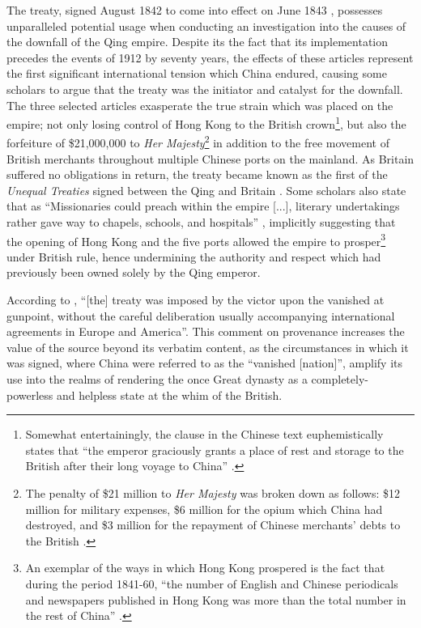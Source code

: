 \documentclass{article}
\begin{document}
The treaty, signed  August 1842 to come into effect on  June 1843
\autocite{Saw:1975}, possesses unparalleled potential usage when conducting an investigation into the causes of the downfall of the Qing empire. Despite its the fact that its implementation precedes the events of 1912 by seventy years, the effects of these articles represent the first significant international tension which China endured, causing some scholars to argue that the treaty was the initiator and catalyst for the downfall. The three selected articles exasperate the true strain which was placed on the empire; not only losing control of Hong Kong to the British crown\footnote{Somewhat entertainingly, the clause in the Chinese text euphemistically states that ``the emperor graciously grants a place of rest and storage to the British after their long voyage to China''
\autocite{Zhang:2007}.}, but also the forfeiture of \$21,000,000 to \textit{Her Majesty}\footnote{The penalty of \$21 million to \textit{Her Majesty} was broken down as follows: \$12 million for military expenses, \$6 million for the opium which China had destroyed, and \$3 million for the repayment of Chinese merchants' debts to the British
\autocite{Hsu:1999}.} in addition to the free movement of British merchants throughout multiple Chinese ports on the mainland. As Britain suffered no obligations in return, the treaty became known as the first of the \textit{Unequal Treaties} signed between the Qing and Britain
\autocite{Hoe:1999}. Some scholars also state that as ``Missionaries could preach within the empire [...], literary undertakings rather gave way to chapels, schools, and hospitals''
\autocite{Britton:1933}, implicitly suggesting that the opening of Hong Kong and the five ports allowed the empire to prosper\footnote{An exemplar of the ways in which Hong Kong prospered is the fact that during the period 1841-60, ``the number of English and Chinese periodicals and newspapers published in Hong Kong was more than the total number in the rest of China''
\autocite{Huang:2001}.} under British rule, hence undermining the authority and respect which had previously been owned solely by the Qing emperor.

According to
\autocite{Hsu:1999}, ``[the] treaty was imposed by the victor upon the vanished at gunpoint, without the careful deliberation usually accompanying international agreements in Europe and America''. This comment on provenance increases the value of the source beyond its verbatim content, as the circumstances in which it was signed, where China were referred to as the ``vanished [nation]'', amplify its use into the realms of rendering the once Great dynasty as a completely-powerless and helpless state at the whim of the British.
\end{document}
